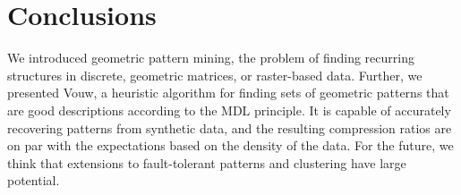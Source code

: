 \documentclass{llncs}
\begin{document}
\section{Conclusions}

We introduced geometric pattern mining, the problem of finding recurring structures in discrete, geometric matrices, or raster-based data. %
Further, we presented Vouw, a heuristic algorithm for finding sets of geometric patterns that are good descriptions according to the MDL principle. It is capable of accurately recovering patterns from synthetic data, and the resulting compression ratios are on par with the expectations based on the density of the data. %
For the future, we think that extensions to fault-tolerant patterns and clustering have large potential.



\end{document}
